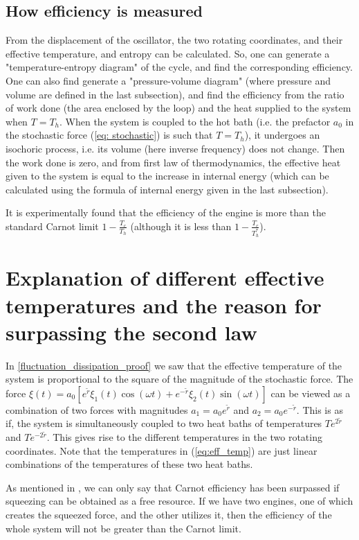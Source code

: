 \documentclass[12pt, twoside]{article}
\begin{document}
\subsection{How efficiency is measured}
From the displacement of the oscillator, the two rotating coordinates, and their effective temperature, and entropy can be calculated. So, one can generate a "temperature-entropy diagram" of the cycle, and find the corresponding efficiency. One can also find generate a "pressure-volume diagram" (where pressure and volume are defined in the last subsection), and find the efficiency from the ratio of work done (the area enclosed by the loop) and the heat supplied to the system when $T = T_h$. When the system is coupled to the hot bath (i.e. the prefactor $a_0$ in the stochastic force (\ref{eq: stochastic}) is such that $T = T_h$), it undergoes an isochoric process, i.e. its volume (here inverse frequency) does not change. Then the work done is zero, and from first law of thermodynamics, the effective heat given to the system is equal to the increase in internal energy (which can be calculated using the formula of internal energy given in the last subsection).

It is experimentally found that the efficiency of the engine is more than the standard Carnot limit $1 - \frac{T_c}{T_h}$ (although it is less than $1 - \frac{T_c}{T^* _h}$).

\section{Explanation of different effective temperatures and the reason for surpassing the second law}
In \ref{fluctuation_dissipation_proof} we saw that the effective temperature of the system is proportional to the square of the magnitude of the stochastic force. The force $\xi(t) =  a_0 [e^{\tilde{r}} \xi_1(t) \cos(\omega t) + e^{-{\tilde{r}}} \xi_2(t)\sin(\omega t)]$ can be viewed as a combination of two forces with magnitudes $a_1 = a_0 e^{\tilde{r}}$ and $a_2 = a_0 e^{-{\tilde{r}}}$. This is as if, the system is simultaneously coupled to two heat baths of temperatures $T e^{2{\tilde{r}}}$ and $T e^{-2{\tilde{r}}}$. This gives rise to the different temperatures in the two rotating coordinates. Note that the temperatures in (\ref{eq:eff_temp}) are just linear combinations of the temperatures of these two heat baths.

As mentioned in \cite{klaers}, we can only say that Carnot efficiency has been surpassed if squeezing can be obtained as a free resource. If we have two engines, one of which creates the squeezed force, and the other utilizes it, then the efficiency of the whole system will not be greater than the Carnot limit.
\end{document}
